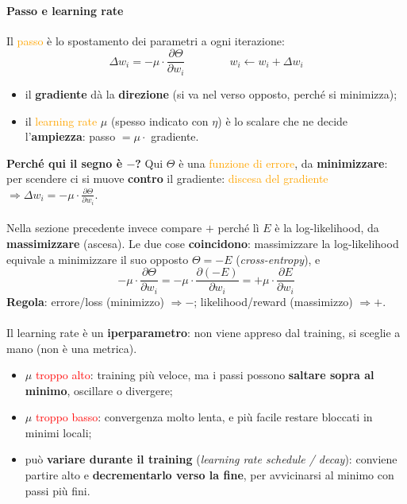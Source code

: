 \documentclass[a4paper,12pt]{article}
\newcommand{\hl}[1]{\textcolor{orange}{#1}}
\begin{document}
\paragraph{Passo e learning rate}
Il \hl{passo} è lo spostamento dei parametri a ogni iterazione:
\[
\Delta w_i = -\mu \cdot \frac{\partial \Theta}{\partial w_i} \qquad\qquad w_i \leftarrow w_i + \Delta w_i
\]
\begin{itemize}
\item il \textbf{gradiente} dà la \textbf{direzione} (si va nel verso opposto, perché si minimizza);
\item il \hl{learning rate} $\mu$ (spesso indicato con $\eta$) è lo scalare che ne decide l'\textbf{ampiezza}: passo $= \mu \cdot$ gradiente.
\end{itemize}
\textbf{Perché qui il segno è $-$?} Qui $\Theta$ è una \hl{funzione di errore}, da \textbf{minimizzare}: per scendere ci si muove \textbf{contro} il gradiente: \hl{discesa del gradiente} $\Rightarrow \Delta w_i = -\mu \cdot \frac{\partial \Theta}{\partial w_i}$.\\
\vspace{1px}\\
Nella sezione precedente invece compare $+$ perché lì $E$ è la log-likelihood, da \textbf{massimizzare} (ascesa). Le due cose \textbf{coincidono}: massimizzare la log-likelihood equivale a minimizzare il suo opposto $\Theta = -E$ (\emph{cross-entropy}), e
\[
-\mu \cdot \frac{\partial \Theta}{\partial w_i} = -\mu \cdot \frac{\partial (-E)}{\partial w_i} = +\mu \cdot \frac{\partial E}{\partial w_i}
\]
\textbf{Regola}: errore/loss (minimizzo) $\Rightarrow -$; likelihood/reward (massimizzo) $\Rightarrow +$.\\
\vspace{1px}\\
Il learning rate è un \textbf{iperparametro}: non viene appreso dal training, si sceglie a mano (non è una metrica).
\begin{itemize}
\item $\mu$ \textcolor{red}{troppo alto}: training più veloce, ma i passi possono \textbf{saltare sopra al minimo}, oscillare o divergere;
\item $\mu$ \textcolor{red}{troppo basso}: convergenza molto lenta, e più facile restare bloccati in minimi locali;
\item può \textbf{variare durante il training} (\emph{learning rate schedule / decay}): conviene partire alto e \textbf{decrementarlo verso la fine}, per avvicinarsi al minimo con passi più fini.
\end{itemize}
\end{document}
